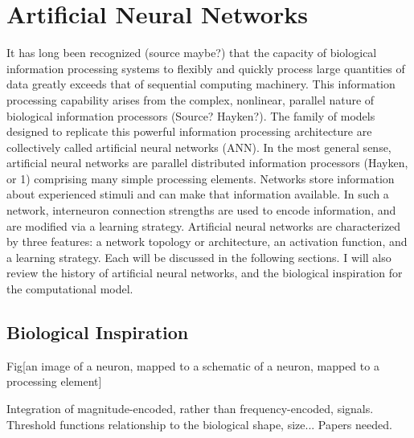 \documentclass[11pt]{afthesis}
\begin{document}
\section{Artificial Neural Networks}


It has long been recognized (source maybe?) that the capacity of biological information processing systems to flexibly and quickly process large quantities of data greatly exceeds that of sequential computing machinery. This information processing capability arises from the complex, nonlinear, parallel nature of biological information processors (Source? Hayken?). The family of models designed to replicate this powerful information processing architecture are collectively called artificial neural networks (ANN). In the most general sense, artificial neural networks are parallel distributed information processors (Hayken, or 1) comprising many simple processing elements. Networks store information about experienced stimuli and can make that information available. In such a network, interneuron connection strengths are used to encode information, and are modified via a learning strategy. Artificial neural networks are characterized by three features: a network topology or architecture, an activation function, and a learning strategy. Each will be discussed in the following sections. I will also review the history of artificial neural networks, and the biological inspiration for the computational model.

\subsection{Biological Inspiration}

Fig[an image of a neuron, mapped to a schematic of a neuron, mapped to a processing element]

Integration of magnitude-encoded, rather than frequency-encoded, signals. 
Threshold functions relationship to the biological shape, size... Papers needed.
\end{document}
